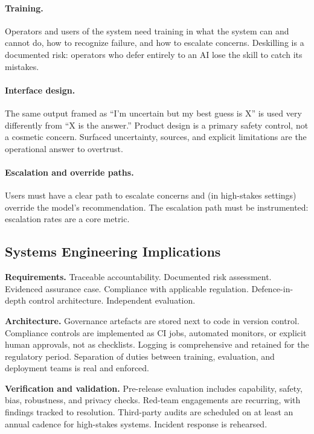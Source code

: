 \paragraph{Training.} Operators and users of the system need
training in what the system can and cannot do, how to recognize
failure, and how to escalate concerns. Deskilling
\citep{reason1990human} is a documented risk: operators who
defer entirely to an AI lose the skill to catch its mistakes.

\paragraph{Interface design.} The same output framed as
``I'm uncertain but my best guess is X'' is used very differently
from ``X is the answer.'' Product design is a primary safety
control, not a cosmetic concern. Surfaced uncertainty, sources,
and explicit limitations are the operational answer to
overtrust.

\paragraph{Escalation and override paths.} Users must have a
clear path to escalate concerns and (in high-stakes settings)
override the model's recommendation. The escalation path must
be instrumented: escalation rates are a core metric.

\subsection{Systems Engineering Implications}

\textbf{Requirements.}
Traceable accountability. Documented risk assessment. Evidenced
assurance case. Compliance with applicable regulation.
Defence-in-depth control architecture. Independent evaluation.

\textbf{Architecture.}
Governance artefacts are stored next to code in version control.
Compliance controls are implemented as CI jobs, automated
monitors, or explicit human approvals, not as checklists.
Logging is comprehensive and retained for the regulatory period.
Separation of duties between training, evaluation, and
deployment teams is real and enforced.

\textbf{Verification and validation.}
Pre-release evaluation includes capability, safety, bias,
robustness, and privacy checks. Red-team engagements are
recurring, with findings tracked to resolution. Third-party
audits are scheduled on at least an annual cadence for
high-stakes systems. Incident response is rehearsed.

